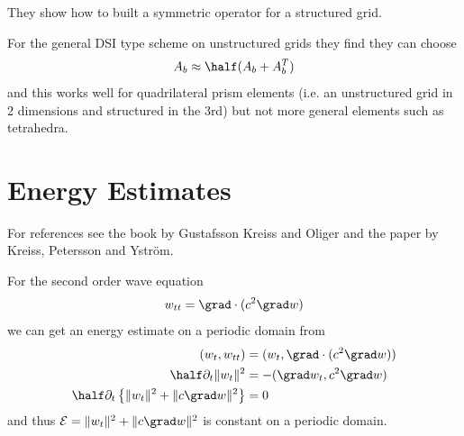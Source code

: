 \documentclass[10pt]{article}
\begin{document}
They show how to built a symmetric operator for a structured grid.


For the general DSI type scheme on unstructured grids they find they can choose
\[
   A_b \approx \half( A_b + A_b^T ) 
\]
and this works well for quadrilateral prism elements (i.e. an unstructured grid in 2 dimensions and
structured in the 3rd) but not more general elements such as tetrahedra.


\clearpage
\section{Energy Estimates}

For references see the book by Gustafsson Kreiss and Oliger\cite{GustafssonKreissOliger95} and the paper
by Kreiss, Petersson and Ystr\"om\cite{KreissPeterssonYstrom2002}.


For the second order wave equation
\[
    w_{tt} = \grad\cdot( c^2  \grad w)
\]
we can get an energy estimate on a periodic domain from 
\begin{align*}
  (w_t,w_{tt}) & = (w_t, \grad\cdot( c^2 \grad w) ) \\
  \half \partial_t \| w_t \|^2 &= - ( \grad w_t, c^2 \grad w ) \\
   \half \partial_t \left\{ \| w_t \|^2 + \| c \grad w \|^2 \right\} &= 0 
\end{align*} 
and thus ${\cal E} = \| w_t \|^2 + \| c \grad w \|^2$ is constant on a periodic domain.
\end{document}
